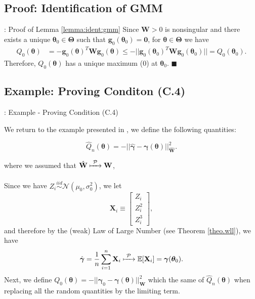 \documentclass[envcountsect,usenames,dvipsnames]{beamer}
\def\btheta{\bm \theta}
\def\bgamma{\bm \gamma}
\def\g{\mathbf{g}}
\def\W{\mathbf{W}}
\def\simiid{\stackrel{iid}{\sim}}
\theoremstyle{mystyle}
\begin{document}
\subsection{Proof: Identification of GMM}
\label{proof_ident_gmm}

\begin{frame}{\thesubsection: Proof of Lemma \ref{lemma:ident:gmm}}
\small
Since $\W > 0$ is nonsingular and there exists a unique $\btheta_0 \in \bm{\Theta}$ such that $\g_0(\btheta_0) = \mathbf{0}$, for $\btheta \in \bm{\Theta}$ we have
\begin{equation*}
    \begin{aligned}
        Q_0(\btheta) &= - \g_0 (\btheta)^T \W \g_0 (\btheta) \leq - || \g_0 (\btheta_0)^T \W \g_0 (\btheta_0)  || = Q_0(\btheta_0).
    \end{aligned}
\end{equation*}
    Therefore, $Q_0(\btheta)$ has a unique maximum ($0$) at $\btheta_0$. \hfill $\blacksquare$
    
    \vspace{0.5cm}
    \hyperlink{lemma:ident:gmm}{}
\end{frame}



\subsection{Example: Proving Conditon (C.4)}
\label{exam:prov:c4}

\begin{frame}{\thesubsection: Example - Proving Condition {\color{beamer@UIUCblue}(C.4)}}

\footnotesize
We return to the example presented in \hyperlink{exampleGMM}{}, we define the following quantities: 

\begin{equation*}
    \hat{Q}_n (\btheta) = -||\hat{\bgamma} - \bgamma (\btheta) ||_{\widehat{\W}}^2. 
\end{equation*}

where we assumed that $\hat{\W} \xmapsto[\;\;\;\;\; ]{\mathcal{P}} \W$,

Since we have $Z_i \simiid \mathcal{N}(\mu_0, \sigma^2_0)$, we let 
%
\begin{equation*}
    \mathbf{X}_i \equiv  \begin{bmatrix}
    Z_i\\
    Z_i^2\\
    Z_i^3
    \end{bmatrix},
\end{equation*}
%
and therefore by the (weak) Law of Large Number (see Theorem \ref{theo.wll}), we have
%
\begin{equation*}
    \hat{\bgamma} = \frac{1}{n} \sum_{i = 1}^n \mathbf{X}_i  \xmapsto[\;\;\;\;\; ]{\mathcal{P}} \mathbb{E}[\mathbf{X}_i] = \bgamma({\btheta_0}).
\end{equation*}
%
Next, we define ${Q}_0 (\btheta) = -||\bgamma_0 - \bgamma (\btheta) ||_\W^2$ which the same of $\hat{Q}_n (\btheta)$ when replacing all the random quantities by the limiting term. 
\end{frame}
\end{document}
